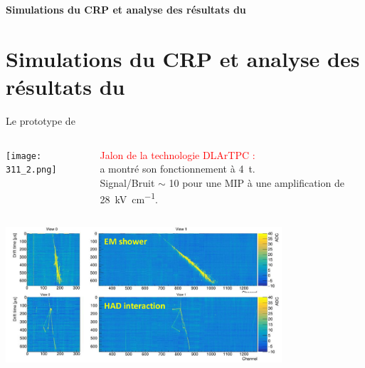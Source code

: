     {
        \begin{specialframe}
            \vspace{2cm}\hspace*{-1.8cm}\parbox[t]{\textwidth}{
                \begin{center}
                    \begin{Huge}
                            \textcolor{pheniics_purple}{\textbf{Simulations du CRP et analyse des résultats du \TOO{}}}
                    \end{Huge}
                \end{center}
            }
        \end{specialframe}
    }

    \section[\TOO{}]{Simulations du CRP et analyse des résultats du \TOO{}}

    \begin{frame}{Le prototype de \TOO{}}
		\begin{columns}
			\begin{column}{0.48\textwidth}
				\centering
				\texttt{[image: 311\_2.png]}
			\end{column}\hfill
			\begin{column}{0.48\textwidth}
				\begin{scriptsize}
					\textcolor{red}{Jalon de la technologie DLArTPC :} \\ a montré son fonctionnement à \SI{4}{\tonne}.\\
					Signal/Bruit $\sim$ 10 pour une MIP à une amplification de \SI{28}{\kilo\volt\per\centi\meter}.
				\end{scriptsize}
			\end{column}\hfill
		\end{columns}
		\centering
		\includegraphics[width=0.77\textwidth]{./pictures/events.png}\\
	\end{frame}
	    
